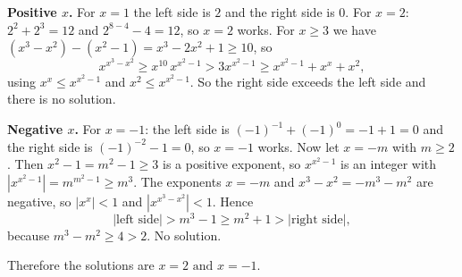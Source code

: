 \textbf{Positive $x$.} For $x=1$ the left side is $2$ and the right side is $0$. For $x=2$: $2^2+2^3=12$ and $2^{8-4}-4=12$, so $x=2$ works. For $x\ge3$ we have $(x^3-x^2)-(x^2-1)=x^3-2x^2+1\ge10$, so
\[
x^{x^3-x^2}\ge x^{10}\,x^{x^2-1}>3x^{x^2-1}\ge x^{x^2-1}+x^x+x^2,
\]
using $x^x\le x^{x^2-1}$ and $x^2\le x^{x^2-1}$. So the right side exceeds the left side and there is no solution.

\textbf{Negative $x$.} For $x=-1$: the left side is $(-1)^{-1}+(-1)^0=-1+1=0$ and the right side is $(-1)^{-2}-1=0$, so $x=-1$ works. Now let $x=-m$ with $m\ge2$. Then $x^2-1=m^2-1\ge3$ is a positive exponent, so $x^{x^2-1}$ is an integer with $|x^{x^2-1}|=m^{m^2-1}\ge m^3$. The exponents $x=-m$ and $x^3-x^2=-m^3-m^2$ are negative, so $|x^x|<1$ and $|x^{x^3-x^2}|<1$. Hence
\[
|\text{left side}|>m^{3}-1\ge m^2+1>|\text{right side}|,
\]
because $m^3-m^2\ge4>2$. No solution.

Therefore the solutions are $\boxed{x=2\text{ and }x=-1}$.
